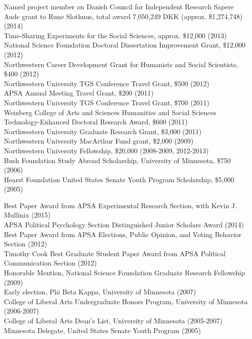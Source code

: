 \documentclass[12pt]{article}
\renewcommand{\section}[1]{\pagebreak[3]%
    \llap{\scshape\smash{\parbox[t]{\marginparwidth}{\raggedright {\color{lg}#1}}}}%
    \vspace{-\baselineskip}\par}
\newcommand{\entry}[1]{\indent {\color{lg}\guillemotright}\hspace{2pt}#1\vspace{.25em}\\}
\begin{document}
\section{Grants\\and\\Funding}
\entry{Named project member on Danish Council for Independent Research Sapere Aude grant to Rune Slothuus, total award 7,050,249 DKK (approx. \$1,274,748) (2014)}
\entry{Time-Sharing Experiments for the Social Sciences, approx. \$12,000 (2013)}
\entry{National Science Foundation Doctoral Dissertation Improvement Grant, \$12,000 (2012)}
\entry{Northwestern Career Development Grant for Humanists and Social Scientists, \$400 (2012)}
\entry{Northwestern University TGS Conference Travel Grant, \$500 (2012)}
\entry{APSA Annual Meeting Travel Grant, \$200 (2011)}
\entry{Northwestern University TGS Conference Travel Grant, \$700 (2011)}
\entry{Weinberg College of Arts and Sciences Humanities and Social Sciences Technology-Enhanced Doctoral Research Award, \$600 (2011)}
\entry{Northwestern University Graduate Research Grant, \$3,000 (2011)}
\entry{Northwestern University MacArthur Fund grant, \$2,000 (2009)}
\entry{Northwestern University Fellowship, \$20,000 (2008-2009, 2012-2013)}
\entry{Bush Foundation Study Abroad Scholarship, University of Minnesota, \$750 (2006)}
\entry{Hearst Foundation United States Senate Youth Program Scholarship, \$5,000 (2005)}

\section{Honors\\and\\Awards}
\entry{Best Paper Award from APSA Experimental Research Section, with Kevin J. Mullinix (2015)}
\entry{APSA Political Psychology Section Distinguished Junior Scholars Award (2014)}
\entry{Best Paper Award from APSA Elections, Public Opinion, and Voting Behavior Section (2012)}
\entry{Timothy Cook Best Graduate Student Paper Award from APSA Political Communication Section (2012)}
\entry{Honorable Mention, National Science Foundation Graduate Research Fellowship (2009)}
\entry{Early election, Phi Beta Kappa, University of Minnesota (2007)}
\entry{College of Liberal Arts Undergraduate Honors Program, University of Minnesota (2006-2007)}
\entry{College of Liberal Arts Dean's List, University of Minnesota (2005-2007)}
\entry{Minnesota Delegate, United States Senate Youth Program (2005)}
\end{document}

